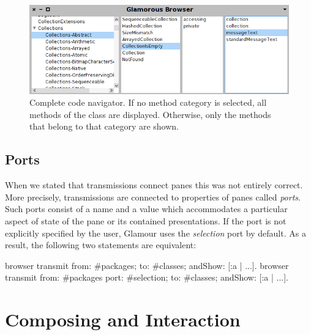 \documentclass[a4paper,10pt,twoside]{book}
\begin{document}
\begin{figure}[htbp]
\centerline{\includegraphics[width=\linewidth]{codenavigator.png}}
\caption{Complete code navigator. If no method category is selected, all methods of the class
are displayed. Otherwise, only the methods that belong to that category are shown.}
\label{fig:codenavigator}
\end{figure}


\subsection{Ports}

When we stated that transmissions connect panes this was not entirely
correct. More precisely, transmissions are connected to properties of
panes called \emph{ports}. Such ports consist of a name and a value
which accommodates a particular aspect of state of the pane or its
contained presentations. If the port is not explicitly specified by
the user, Glamour uses the \emph{selection} port by default. As a
result, the following two statements are equivalent:

\begin{code}{}
browser transmit from: #packages; to: #classes; andShow: [:a | ...].
browser transmit from: #packages port: #selection; to: #classes; andShow: [:a | ...].
\end{code}




\section{Composing and Interaction}
\end{document}
